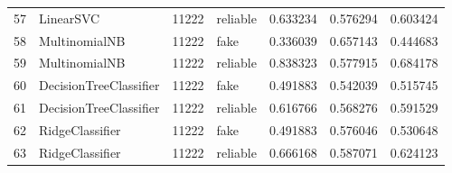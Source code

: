 \begin{longtable}{llllrrr}
57 &               LinearSVC &        11222 &  reliable &  0.633234 &   0.576294 &  0.603424 \\
58 &           MultinomialNB &        11222 &      fake &  0.336039 &   0.657143 &  0.444683 \\
59 &           MultinomialNB &        11222 &  reliable &  0.838323 &   0.577915 &  0.684178 \\
60 &  DecisionTreeClassifier &        11222 &      fake &  0.491883 &   0.542039 &  0.515745 \\
61 &  DecisionTreeClassifier &        11222 &  reliable &  0.616766 &   0.568276 &  0.591529 \\
62 &         RidgeClassifier &        11222 &      fake &  0.491883 &   0.576046 &  0.530648 \\
63 &         RidgeClassifier &        11222 &  reliable &  0.666168 &   0.587071 &  0.624123 \\
\bottomrule
\end{longtable}

